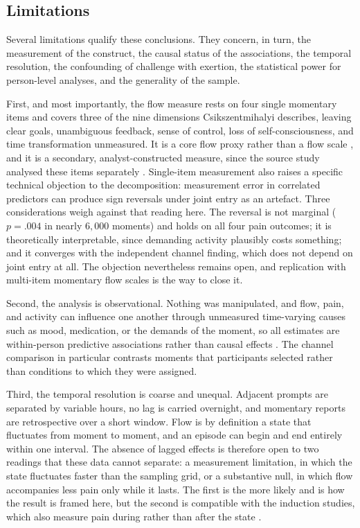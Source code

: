 \documentclass[11pt,a4paper]{article}
\begin{document}
\subsection{Limitations}
Several limitations qualify these conclusions. They concern, in turn, the measurement of the
construct, the causal status of the associations, the temporal resolution, the confounding of
challenge with exertion, the statistical power for person-level analyses, and the generality of the
sample.

First, and most importantly, the flow measure rests on four single momentary items and covers three
of the nine dimensions Csikszentmihalyi describes, leaving clear goals, unambiguous feedback, sense
of control, loss of self-consciousness, and time transformation unmeasured. It is a core flow proxy
rather than a flow scale \citep{jackson2002assessing}, and it is a secondary,
analyst-constructed measure, since the source study analysed these items separately
\citep{viane2004acceptance}. Single-item measurement also raises a specific technical objection to
the decomposition: measurement error in correlated predictors can produce sign reversals under
joint entry as an artefact. Three considerations weigh against that reading here. The reversal is
not marginal ($p=.004$ in nearly $6{,}000$ moments) and holds on all four pain outcomes; it is
theoretically interpretable, since demanding activity plausibly costs something; and it converges
with the independent channel finding, which does not depend on joint entry at all. The objection
nevertheless remains open, and replication with multi-item momentary flow scales is the way to
close it.

Second, the analysis is observational. Nothing was manipulated, and flow, pain, and activity can
influence one another through unmeasured time-varying causes such as mood, medication, or the
demands of the moment, so all estimates are within-person predictive associations rather than
causal effects \citep{rohrer2018thinking}. The channel comparison in particular contrasts moments
that participants selected rather than conditions to which they were assigned.

Third, the temporal resolution is coarse and unequal. Adjacent prompts are separated by variable
hours, no lag is carried overnight, and momentary reports are retrospective over a short window.
Flow is by definition a state that fluctuates from moment to moment, and an episode can begin and
end entirely within one interval. The absence of lagged effects is therefore open to two readings
that these data cannot separate: a measurement limitation, in which the state fluctuates faster
than the sampling grid, or a substantive null, in which flow accompanies less pain only while it
lasts. The first is the more likely and is how the result is framed here, but the second is
compatible with the induction studies, which also measure pain during rather than after the state
\citep{hamaker2017no}.
\end{document}

